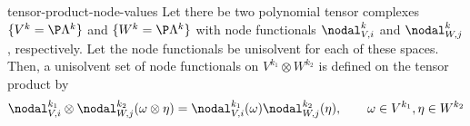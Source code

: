 \begin{Theorem}{tensor-product-node-values}
  Let there be two polynomial tensor complexes $\{V^k=\P\Lambda^k\}$
  and $\{W^k=\P\Lambda^k\}$ with node functionals $\nodal_{V,i}^k$ and
  $\nodal_{W,j}^k$, respectively. Let the node functionals be
  unisolvent for each of these spaces. Then, a unisolvent set of node
  functionals on $V^{k_1}\otimes W^{k_2}$ is defined on the tensor product by
  \begin{gather}
    \nodal_{V,i}^{k_1}\otimes\nodal_{W,j}^{k_2}(\omega\otimes\eta)
    = \nodal_{V,i}^{k_1}(\omega)\nodal_{W,j}^{k_2}(\eta),
    \qquad \omega\in V^{k_1}, \eta\in W^{k_2}
  \end{gather}
\end{Theorem}



